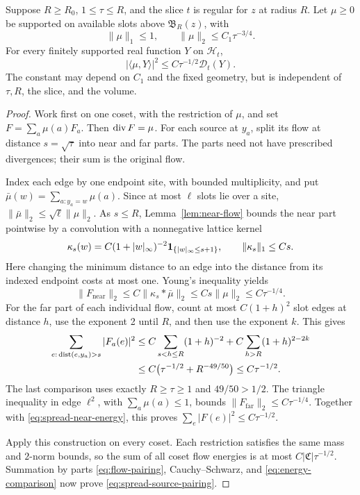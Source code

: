\begin{proposition}\label{prop:spread-energy}
Suppose \(R\ge R_0\), \(1\le\tau\le R\), and the slice \(t\)
is regular for \(z\) at radius \(R\).
Let \(\mu\ge0\) be supported on available slots above
\(\mathfrak B_R(z)\), with
\[
 \|\mu\|_1\le1,\qquad \|\mu\|_2\le C_1\tau^{-3/4}.
\]
For every finitely supported real function \(Y\) on \(\mathcal H_t\),
\begin{equation}\label{eq:spread-source-pairing}
 |\langle\mu,Y\rangle|^2
 \le C\tau^{-1/2}\mathcal D_t(Y).
\end{equation}
The constant may depend on \(C_1\) and the fixed geometry, but is
independent of \(\tau,R\), the slice, and the volume.
\end{proposition}

\begin{proof}
Work first on one coset, with the restriction of \(\mu\), and set
\(F=\sum_a\mu(a)F_a\).  Then \(\operatorname{div} F=\mu\).
For each source at \(y_a\), split its flow at distance
\(s=\sqrt\tau\) into near and far parts.  The parts need not have
prescribed divergences; their sum is the original flow.

Index each edge by one endpoint site, with bounded multiplicity, and
put \(\bar\mu(w)=\sum_{a:y_a=w}\mu(a)\).  Since at most \(\ell\)
slots lie over a site,
\(\|\bar\mu\|_2\le\sqrt\ell\|\mu\|_2\).
As \(s\le R\), Lemma~\ref{lem:near-flow} bounds the near part
pointwise by a convolution with a nonnegative lattice kernel
\[
 \kappa_s(w)=C(1+|w|_\infty)^{-2}
                     \mathbf1_{\{|w|_\infty\le s+1\}},
 \qquad \|\kappa_s\|_1\le Cs.
\]
Here changing the minimum distance to an edge into the distance from
its indexed endpoint costs at most one.  Young's inequality yields
\begin{equation}\label{eq:spread-near-energy}
 \|F_{\mathrm{near}}\|_2
 \le C\|\kappa_s*\bar\mu\|_2
 \le Cs\|\mu\|_2
 \le C\tau^{-1/4}.
\end{equation}
For the far part of each individual flow, count at most \(C(1+h)^2\)
slot edges at distance \(h\), use the exponent 2 until \(R\), and
then use the exponent \(k\).  This gives
\begin{align}
 \sum_{e:\,\operatorname{dist}(e,y_a)>s}|F_a(e)|^2
 &\le C\sum_{s<h\le R}(1+h)^{-2}
      +C\sum_{h>R}(1+h)^{2-2k} \notag\\
 &\le C\bigl(\tau^{-1/2}+R^{-49/50}\bigr)
 \le C\tau^{-1/2}.                         \label{eq:spread-far-energy}
\end{align}
The last comparison uses exactly \(R\ge\tau\ge1\) and
\(49/50>1/2\).  The triangle inequality in edge \(\ell^2\), with
\(\sum_a\mu(a)\le1\), bounds
\(\|F_{\mathrm{far}}\|_2\le C\tau^{-1/4}\).
Together with \eqref{eq:spread-near-energy}, this proves
\(\sum_e|F(e)|^2\le C\tau^{-1/2}\).

Apply this construction on every coset.  Each restriction satisfies
the same mass and \(2\)-norm bounds, so the sum of all coset flow
energies is at most \(C|\mathfrak C|\tau^{-1/2}\).
Summation by parts \eqref{eq:flow-pairing}, Cauchy--Schwarz, and
\eqref{eq:energy-comparison} now prove
\eqref{eq:spread-source-pairing}.
\end{proof}


